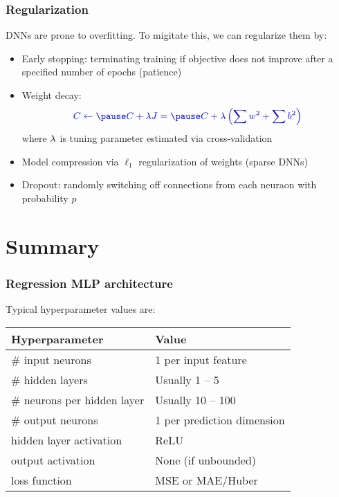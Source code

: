 \documentclass[smaller]{beamer}
\begin{document}
\begin{frame}
  \frametitle{Regularization}
  \pe
  DNNs are prone to overfitting. \pe To migitate this, we can regularize them by: \pe
  \begin{itemize}
  \item Early stopping: terminating training if objective does not improve after a specified number of epochs (patience) \pe
  \item Weight decay: \pe
     \begin{equation}\bl 
      C \leftarrow \pause C + \la J = \pause C + \la\lt(\sum w^2 + \sum b^2\rt)
    \end{equation}
    \pause where $\lambda$ is tuning parameter estimated via cross-validation
  \pe
\item Model compression via $\ell_{1}$ regularization of weights (sparse DNNs) \pe
\item Dropout: \pe randomly switching off connections from each neuraon with probability $p$
    \end{itemize}

\end{frame}

\section{Summary}

\begin{frame}
  \frametitle{Regression MLP architecture}
  \pause
  Typical hyperparameter values are: \pause

  \begin{table}\centering
  \begin{tabular}[t]{l l}
    \bf Hyperparameter & \bf Value \\\midrule
    \# input neurons & 1 per input feature \\[2mm]\pause
    \# hidden layers & Usually 1 -- 5 \\[2mm]\pause
    \# neurons per hidden layer & Usually 10 -- 100 \\[2mm]\pause
    \# output neurons & 1 per prediction dimension \\[2mm]\pause
    hidden layer activation & ReLU \\[2mm]\pause
    output activation & None (if unbounded) \\[2mm]\pause
    loss function & MSE or MAE/Huber
  \end{tabular}
\end{table}
\end{frame}
\end{document}

